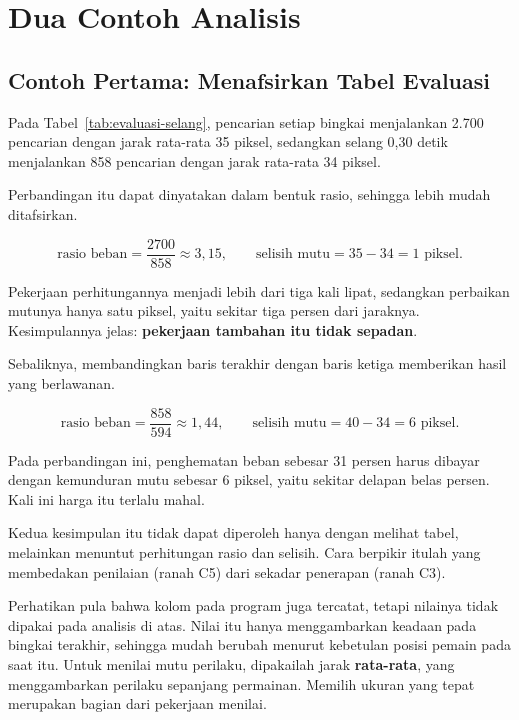 \section{Dua Contoh Analisis}
\label{sec:contoh-bab-11}

\subsection{Contoh Pertama: Menafsirkan Tabel Evaluasi}

\begin{contohbox}
Pada Tabel~\ref{tab:evaluasi-selang}, pencarian setiap bingkai menjalankan
2.700 pencarian dengan jarak rata-rata 35 piksel, sedangkan selang 0,30 detik
menjalankan 858 pencarian dengan jarak rata-rata 34 piksel.
\end{contohbox}

Perbandingan itu dapat dinyatakan dalam bentuk rasio, sehingga lebih mudah
ditafsirkan.

\[
\text{rasio beban} = \frac{2700}{858} \approx 3{,}15,
\qquad
\text{selisih mutu} = 35 - 34 = 1 \text{ piksel}.
\]

Pekerjaan perhitungannya menjadi lebih dari tiga kali lipat, sedangkan
perbaikan mutunya hanya satu piksel, yaitu sekitar tiga persen dari jaraknya.
Kesimpulannya jelas: \textbf{pekerjaan tambahan itu tidak sepadan}.

Sebaliknya, membandingkan baris terakhir dengan baris ketiga memberikan hasil
yang berlawanan.

\[
\text{rasio beban} = \frac{858}{594} \approx 1{,}44,
\qquad
\text{selisih mutu} = 40 - 34 = 6 \text{ piksel}.
\]

Pada perbandingan ini, penghematan beban sebesar 31 persen harus dibayar dengan
kemunduran mutu sebesar 6 piksel, yaitu sekitar delapan belas persen. Kali ini
harga itu terlalu mahal.

Kedua kesimpulan itu tidak dapat diperoleh hanya dengan
melihat tabel, melainkan menuntut perhitungan rasio dan selisih. Cara berpikir
itulah yang membedakan penilaian (ranah C5) dari sekadar penerapan (ranah C3).

\begin{catatabox}
Perhatikan pula bahwa kolom  pada program juga tercatat,
tetapi nilainya tidak dipakai pada analisis di atas. Nilai itu hanya
menggambarkan keadaan pada bingkai terakhir, sehingga mudah berubah menurut
kebetulan posisi pemain pada saat itu. Untuk menilai mutu perilaku, dipakailah
jarak \textbf{rata-rata}, yang menggambarkan perilaku sepanjang permainan.
Memilih ukuran yang tepat merupakan bagian dari pekerjaan menilai.
\end{catatabox}

